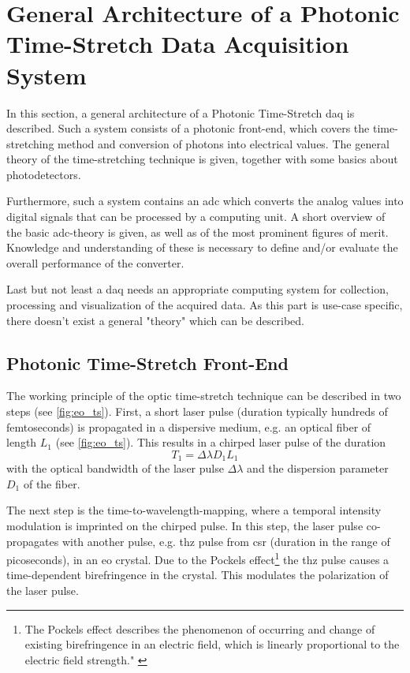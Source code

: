 \section{General Architecture of a Photonic Time-Stretch Data Acquisition System}
In this section, a general architecture of a Photonic Time-Stretch \gls{daq} is described. Such a system consists of a photonic front-end, which covers the time-stretching method and conversion of photons into electrical values. The general theory of the time-stretching technique is given, together with some basics about photodetectors. 

Furthermore, such a system contains an \gls{adc} which converts the analog values into digital signals that can be processed by a computing unit. A short overview of the basic \gls{adc}-theory is given, as well as of the most prominent figures of merit. Knowledge and understanding of these is necessary to define and/or evaluate the overall performance of the converter. 

Last but not least a \gls{daq} needs an appropriate computing system for collection, processing and visualization of the acquired data. As this part is use-case specific, there doesn't exist a general "theory" which can be described.

\subsection{Photonic Time-Stretch Front-End}
The working principle of the optic time-stretch technique can be described in two steps (see \autoref{fig:eo_ts}).
First, a short laser pulse (duration typically hundreds of femtoseconds) is propagated in a dispersive medium, e.g. an optical fiber of length $L_1$ (see \autoref{fig:eo_ts}). 
This results in a chirped laser pulse of the duration
\begin{equation}
	T_1 = \Delta \lambda D_1 L_1
\end{equation}
with the optical bandwidth of the laser pulse $\Delta \lambda$  and the dispersion parameter $D_1$ of the fiber.

The next step is the time-to-wavelength-mapping, where a temporal intensity modulation is imprinted on the chirped pulse. In this step, the laser pulse co-propagates with another pulse, e.g. \gls{thz} pulse from \gls{csr} (duration in the range of picoseconds), in an \gls{eo} crystal. Due to the Pockels effect\footnote{The Pockels effect describes the phenomenon of occurring and change of existing birefringence in an electric field, which is linearly proportional to the electric field strength." \cite{pockels}} the \gls{thz} pulse causes a time-dependent birefringence in the crystal.
This modulates the polarization of the laser pulse.

